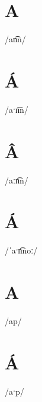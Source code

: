 \documentclass[10pt,a4paper,twoside]{book}
\begin{document}
\section*{A}

\begin{multicols}{3}
 {/an͡n/} {}
\end{multicols}

\section*{Á}

\begin{multicols}{3}
 {/aˑn͡n/} {}
\end{multicols}

\section*{Â}

\begin{multicols}{3}
 {/aːn͡n/} {}
\end{multicols}

\section*{Á}

\begin{multicols}{3}
 {/ˈaˑn͡noː/} {}
\end{multicols}

\section*{A}

\begin{multicols}{3}
 {/ap/} {}
\end{multicols}

\section*{Á}

\begin{multicols}{3}
 {/aˑp/} {}
\end{multicols}
\end{document}
